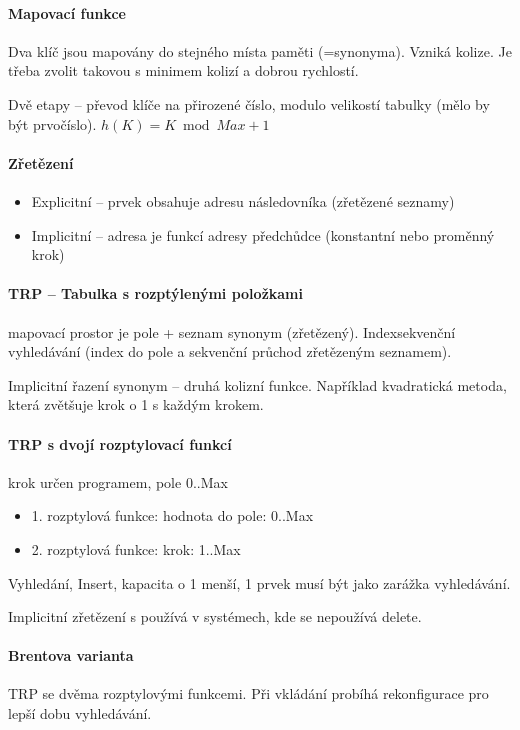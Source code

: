 \documentclass[a4paper, 11pt]{report}
\begin{document}
\paragraph{Mapovací funkce}

Dva klíč jsou mapovány do stejného místa paměti (=synonyma). Vzniká kolize. Je třeba zvolit takovou s minimem kolizí a dobrou rychlostí.

Dvě etapy -- převod klíče na přirozené číslo, modulo velikostí tabulky (mělo by být prvočíslo). $h(K) = K \bmod Max + 1$

\paragraph{Zřetězení}
\begin{itemize}
	\item Explicitní -- prvek obsahuje adresu následovníka (zřetězené seznamy)
	\item Implicitní -- adresa je funkcí adresy předchůdce (konstantní nebo proměnný krok)
\end{itemize}

\paragraph{TRP -- Tabulka s rozptýlenými položkami}
mapovací prostor je pole + seznam synonym (zřetězený). Indexsekvenční vyhledávání (index do pole a sekvenční průchod zřetězeným seznamem).

Implicitní řazení synonym -- druhá kolizní funkce. Například kvadratická metoda, která zvětšuje krok o 1 s každým krokem.

\paragraph{TRP s dvojí rozptylovací funkcí}
krok určen programem, pole 0..Max
\begin{itemize}
	\item 1. rozptylová funkce: hodnota do pole: 0..Max
	\item 2. rozptylová funkce: krok: 1..Max
\end{itemize}

Vyhledání, Insert, kapacita o 1 menší, 1 prvek musí být jako zarážka vyhledávání.

Implicitní zřetězení s používá v systémech, kde se nepoužívá delete.

\paragraph{Brentova varianta}
TRP se dvěma rozptylovými funkcemi. Při vkládání probíhá rekonfigurace pro lepší dobu vyhledávání.
\end{document}
